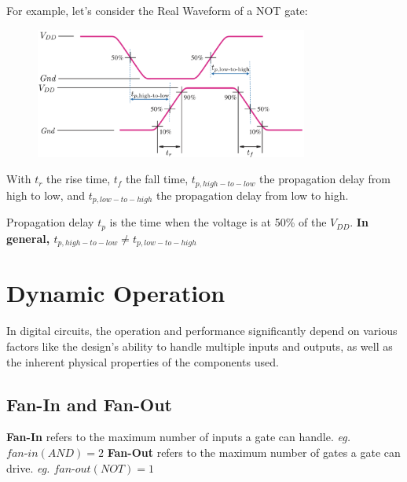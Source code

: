 \documentclass[12pt,openany, tikz,border=10pt]{book}
\newcommand{\minidash}{\text{-}}
\begin{document}
			      	\vspace*{10px}
			      	For example, let's consider the Real Waveform of a NOT gate:
			      	\begin{figure}[h]
			      		\centering
			      		\includegraphics[width=0.8\textwidth]{circuits/9.3.2.png} 
			      	\end{figure}
			      	
			      	With $t_r$ the rise time, $t_f$ the fall time, $t_{p,high-to-low}$ the propagation delay from high to low, and $t_{p,low-to-high}$ the propagation delay from low to high. \newline
			      	
			      	Propagation delay $t_p$ is the time when the voltage is at 50\% of the $V_{DD}$.\newline 
			      	\textbf{In general, $t_{p,high-to-low} \neq t_{p,low-to-high}$} \newline
			      	\newpage
			      	\section{Dynamic Operation}
			      	
			      	In digital circuits, the operation and performance significantly depend on various factors like the design's ability to handle multiple inputs and outputs, as well as the inherent physical properties of the components used. 
			      	
			      	\subsection{Fan-In and Fan-Out}
			      	
			      	\textbf{Fan-In} refers to the maximum number of inputs a gate can handle. \textit{eg. $fan\minidash{}in(AND) = 2$}
			      	\vspace{10px}
			      	\newline
			      	\textbf{Fan-Out} refers to the maximum number of gates a gate can drive. \textit{eg. $fan\minidash{}out(NOT) = 1$}
			      	
\end{document}
